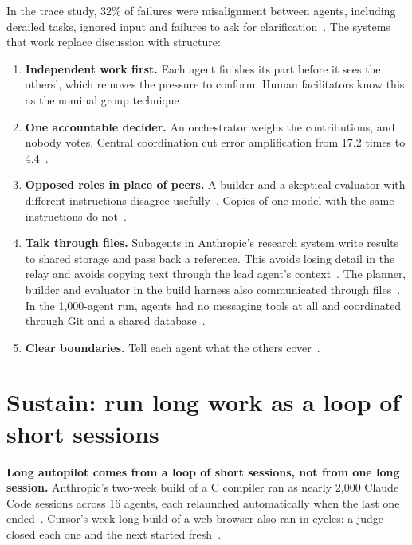 \documentclass[11pt,letterpaper]{article}
\newcommand{\takeaway}[1]{\textbf{#1}}
\begin{document}
In the trace study, 32\% of failures were misalignment between agents, including derailed
tasks, ignored input and failures to ask for clarification~\cite{mast}. The systems that work
replace discussion with structure:

\begin{enumerate}[leftmargin=1.5em]
  \item \textbf{Independent work first.} Each agent finishes its part before it sees the
        others', which removes the pressure to conform. Human facilitators know this as the
        nominal group technique~\cite{delbecq}.
  \item \textbf{One accountable decider.} An orchestrator weighs the contributions, and nobody
        votes. Central coordination cut error amplification from 17.2 times to
        4.4~\cite{kim}.
  \item \textbf{Opposed roles in place of peers.} A builder and a skeptical evaluator with
        different instructions disagree usefully~\cite{harness}. Copies of one model with the
        same instructions do not~\cite{cais}.
  \item \textbf{Talk through files.} Subagents in Anthropic's research system write results to
        shared storage and pass back a reference. This avoids losing detail in the relay and
        avoids copying text through the lead agent's context~\cite{research}. The planner,
        builder and evaluator in the build harness also communicated through
        files~\cite{harness}. In the 1,000-agent run, agents had no messaging tools at all
        and coordinated through Git and a shared database~\cite{fermat}.
  \item \textbf{Clear boundaries.} Tell each agent what the others cover~\cite{research}.
\end{enumerate}

\section{Sustain: run long work as a loop of short sessions}\label{sec:sustain}

\takeaway{Long autopilot comes from a loop of short sessions, not from one long session.}
Anthropic's two-week build of a C compiler ran as nearly 2,000 Claude Code sessions across 16
agents, each relaunched automatically when the last one ended~\cite{carlini}. Cursor's
week-long build of a web browser also ran in cycles: a judge closed each one and the next
started fresh~\cite{cursor}.
\end{document}
